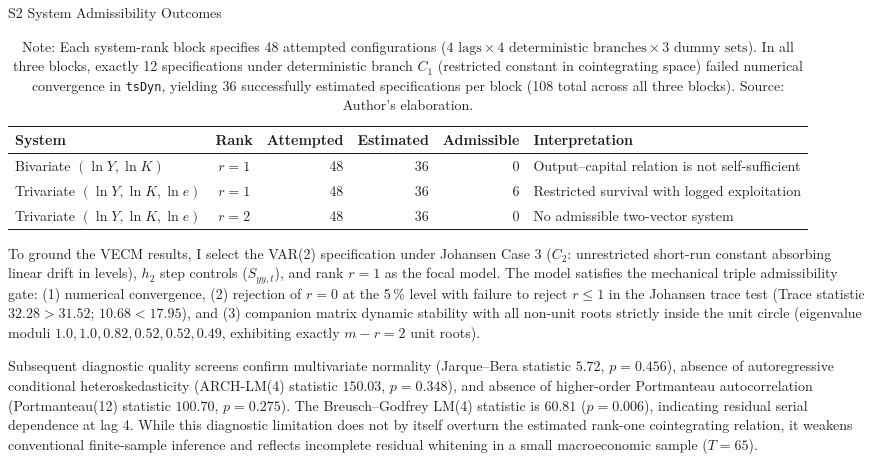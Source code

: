\begin{table}[H]
\centering
\caption{S2 System Admissibility Outcomes}
\label{tab:s2_admissibility_outcomes}
\footnotesize
\begin{tabular}{@{}>{\raggedright\arraybackslash}p{3.6cm}crrr>{\raggedright\arraybackslash}p{4.4cm}@{}}
\toprule
System & Rank & Attempted & Estimated & Admissible & Interpretation \\
\midrule
\midrule
Bivariate $(\ln Y,\ln K)$ & $r=1$ & 48 & 36 & 0 & Output--capital relation is not self-sufficient \\
Trivariate $(\ln Y,\ln K,\ln e)$ & $r=1$ & 48 & 36 & 6 & Restricted survival with logged exploitation \\
Trivariate $(\ln Y,\ln K,\ln e)$ & $r=2$ & 48 & 36 & 0 & No admissible two-vector system \\
\bottomrule
\end{tabular}
\caption*{\footnotesize Note: Each system-rank block specifies 48 attempted configurations ($4\text{ lags} \times 4\text{ deterministic branches} \times 3\text{ dummy sets}$). In all three blocks, exactly 12 specifications under deterministic branch $C_1$ (restricted constant in cointegrating space) failed numerical convergence in \texttt{tsDyn}, yielding 36 successfully estimated specifications per block (108 total across all three blocks). Source: Author's elaboration.}
\end{table}

To ground the VECM results, I select the VAR(2) specification under Johansen Case 3 ($C_2$: unrestricted short-run constant absorbing linear drift in levels), $h_2$ step controls ($S_{yy,t}$), and rank $r=1$ as the focal model. The model satisfies the mechanical triple admissibility gate: (1) numerical convergence, (2) rejection of $r=0$ at the 5\,\% level with failure to reject $r \leq 1$ in the Johansen trace test (Trace statistic $32.28 > 31.52$; $10.68 < 17.95$), and (3) companion matrix dynamic stability with all non-unit roots strictly inside the unit circle (eigenvalue moduli $1.0, 1.0, 0.82, 0.52, 0.52, 0.49$, exhibiting exactly $m - r = 2$ unit roots).

Subsequent diagnostic quality screens confirm multivariate normality (Jarque--Bera statistic $5.72$, $p=0.456$), absence of autoregressive conditional heteroskedasticity (ARCH-LM(4) statistic $150.03$, $p=0.348$), and absence of higher-order Portmanteau autocorrelation (Portmanteau(12) statistic $100.70$, $p=0.275$). The Breusch--Godfrey LM(4) statistic is $60.81$ ($p=0.006$), indicating residual serial dependence at lag 4. While this diagnostic limitation does not by itself overturn the estimated rank-one cointegrating relation, it weakens conventional finite-sample inference and reflects incomplete residual whitening in a small macroeconomic sample ($T=65$).


